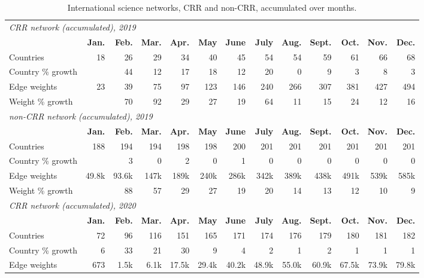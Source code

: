 \begin{table}[ht]
\caption{International science networks, CRR and non-CRR, accumulated over months.}
\label{tab:AccumulatedNetworks}
\centering
\begin{tabular}{lrrrrrrrrrrrr}
  \hline
 \multicolumn{13}{l}{\textit{CRR network (accumulated), 2019}} \\
& {\bf Jan.} & {\bf Feb.} & {\bf Mar.} & {\bf Apr.} &  {\bf May} &  {\bf June} &  {\bf July} &   {\bf Aug.} &  {\bf Sept.} &  {\bf Oct.} &  {\bf Nov.} &  {\bf Dec.} \\ Countries & 18 & 26 & 29 & 34 & 40 & 45 & 54 & 54 & 59 & 61 & 66 & 68 \\ 
 Country \% growth &  & 44 & 12 & 17 & 18 & 12 & 20 & 0 & 9 & 3 & 8 & 3 \\ 
 Edge weights & 23 & 39 & 75 & 97 & 123 & 146 & 240 & 266 & 307 & 381 & 427 & 494 \\ 
  Weight \% growth &  & 70 & 92 & 29 & 27 & 19 & 64 & 11 & 15 & 24 & 12 & 16 \\ 
   \hline
 \hline
  \multicolumn{13}{l}{\textit{non-CRR network (accumulated), 2019}} \\
& {\bf Jan.} & {\bf Feb.} & {\bf Mar.} & {\bf Apr.} &  {\bf May} &  {\bf June} &  {\bf July} &   {\bf Aug.} &  {\bf Sept.} &  {\bf Oct.} &  {\bf Nov.} &  {\bf Dec.} \\   \hline
Countries & 188 & 194 & 194 & 198 & 198 & 200 & 201 & 201 & 201 & 201 & 201 & 201 \\ 
  Country \% growth &  & 3 & 0 & 2 & 0 & 1 & 0 & 0 & 0 & 0 & 0 & 0 \\ 
  Edge weights  & 49.8k & 93.6k & 147k & 189k & 240k & 286k & 342k & 389k & 438k & 491k & 539k & 585k \\ 
  Weight \% growth &  & 88 & 57 & 29 & 27 & 19 & 20 & 14 & 13 & 12 & 10 & 9 \\ 
   \hline
  \hline
 \multicolumn{13}{l}{\textit{CRR network (accumulated), 2020}} \\
& {\bf Jan.} & {\bf Feb.} & {\bf Mar.} & {\bf Apr.} &  {\bf May} &  {\bf June} &  {\bf July} &   {\bf Aug.} &  {\bf Sept.} &  {\bf Oct.} &  {\bf Nov.} &  {\bf Dec.} \\   \hline
Countries & 72 & 96 & 116 & 151 & 165 & 171 & 174 & 176 & 179 & 180 & 181 & 182 \\ 
  Country \% growth & 6 & 33 & 21 & 30 & 9 & 4 & 2 & 1 & 2 & 1 & 1 & 1 \\ 
  Edge weights & 673 & 1.5k & 6.1k & 17.5k & 29.4k & 40.2k & 48.9k & 55.0k & 60.9k & 67.5k & 73.9k & 79.8k \\ 

\end{tabular}
\end{table}
